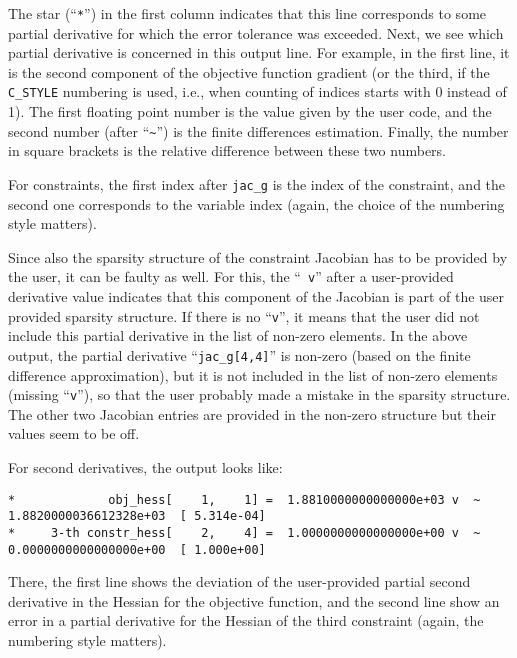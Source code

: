 \documentclass[10pt]{article}
\begin{document}
The star (``\verb|*|'') in the first column indicates that this line
corresponds to some partial derivative for which the error tolerance
was exceeded.  Next, we see which partial derivative is concerned in
this output line.  For example, in the first line, it is the second
component of the objective function gradient (or the third, if the
{\tt C\_STYLE} numbering is used, i.e., when counting of indices
starts with 0 instead of 1).  The first floating point number is the
value given by the user code, and the second number (after
``\verb|~|'') is the finite differences estimation.  Finally, the
number in square brackets is the relative difference between these two
numbers.

For constraints, the first index after {\tt jac\_g} is the index of
the constraint, and the second one corresponds to the variable index
(again, the choice of the numbering style matters).

Since also the sparsity structure of the constraint Jacobian has to be
provided by the user, it can be faulty as well.  For this, the ``{\tt
  v}'' after a user-provided derivative value indicates that this
component of the Jacobian is part of the user provided sparsity
structure.  If there is no ``{\tt v}'', it means that the user did not
include this partial derivative in the list of non-zero elements.  In
the above output, the partial derivative ``{\tt jac\_g[4,4]}'' is
non-zero (based on the finite difference approximation), but it is not
included in the list of non-zero elements (missing ``{\tt v}''), so
that the user probably made a mistake in the sparsity structure.  The
other two Jacobian entries are provided in the non-zero structure but
their values seem to be off.

For second derivatives, the output looks like:

\begin{footnotesize}
\begin{verbatim}
*             obj_hess[    1,    1] =  1.8810000000000000e+03 v  ~  1.8820000036612328e+03  [ 5.314e-04]
*     3-th constr_hess[    2,    4] =  1.0000000000000000e+00 v  ~  0.0000000000000000e+00  [ 1.000e+00]
\end{verbatim}
\end{footnotesize}

There, the first line shows the deviation of the user-provided partial
second derivative in the Hessian for the objective function, and the
second line show an error in a partial derivative for the Hessian of
the third constraint (again, the numbering style matters).
\end{document}

